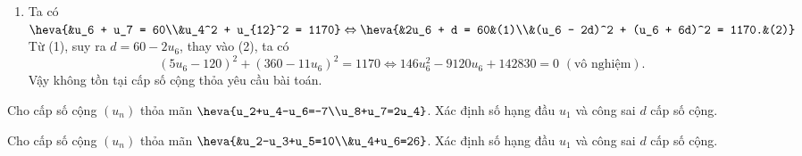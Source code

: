 \begin{bt}
{\begin{enumerate}
			Vậy số hạng đầu của cấp số cộng là $u_1 = 3$, công sai là $d = 2$ hoặc $u_1 = -17$, $d = 2$.
			\item Ta có $\heva{&u_6 + u_7 = 60\\&u_4^2 + u_{12}^2 = 1170} \Leftrightarrow \heva{&2u_6 + d = 60&(1)\\&(u_6 - 2d)^2 + (u_6 + 6d)^2 = 1170.&(2)}$\\
			Từ (1), suy ra $d = 60 - 2u_6$, thay vào (2), ta có
			$$(5u_6 - 120)^2 + (360 - 11u_6)^2 = 1170 \Leftrightarrow 146u_6^2 - 9120u_6 + 142830 = 0 \,\, (\text{vô nghiệm}).$$ 
			Vậy không tồn tại cấp số cộng thỏa yêu cầu bài toán.
		\end{enumerate}
	}
\end{bt}
	

\begin{bt}%
	Cho cấp số cộng $ (u_n) $ thỏa mãn $ \heva{u_2+u_4-u_6=-7\\u_8+u_7=2u_4} $. Xác định số hạng đầu $ u_1 $ và công sai $ d $ cấp số cộng.        
	
\end{bt}

\begin{bt}%
Cho cấp số cộng $ (u_n) $ thỏa mãn $ \heva{&u_2-u_3+u_5=10\\&u_4+u_6=26} $. Xác định số hạng đầu $ u_1 $ và công sai $ d $ cấp số cộng.         
\end{bt}

